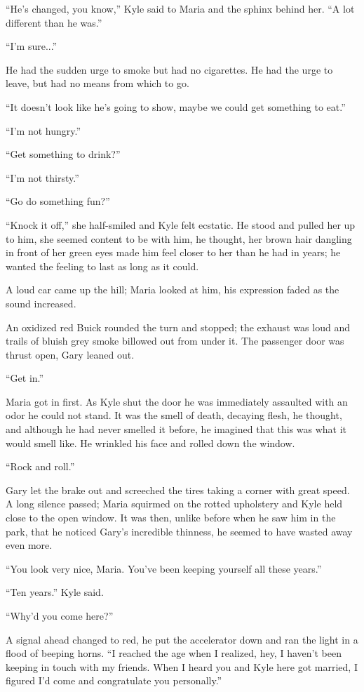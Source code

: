 ``He's changed, you know,'' Kyle said to Maria and the sphinx behind
her. ``A lot different than he was.''

``I'm sure...''

He had the sudden urge to smoke but had no cigarettes. He had the urge
to leave, but had no means from which to go.

``It doesn't look like he's going to show, maybe we could get something
to eat.''

``I'm not hungry.''

``Get something to drink?''

``I'm not thirsty.''

``Go do something fun?''

``Knock it off,'' she half-smiled and Kyle felt ecstatic. He stood and
pulled her up to him, she seemed content to be with him, he thought, her
brown hair dangling in front of her green eyes made him feel closer to
her than he had in years; he wanted the feeling to last as long as it
could.

A loud car came up the hill; Maria looked at him, his expression faded
as the sound increased.

An oxidized red Buick rounded the turn and stopped; the exhaust was loud
and trails of bluish grey smoke billowed out from under it. The
passenger door was thrust open, Gary leaned out.

``Get in.''

Maria got in first. As Kyle shut the door he was immediately assaulted
with an odor he could not stand. It was the smell of death, decaying
flesh, he thought, and although he had never smelled it before, he
imagined that this was what it would smell like. He wrinkled his face
and rolled down the window.

``Rock and roll.''

Gary let the brake out and screeched the tires taking a corner with
great speed. A long silence passed; Maria squirmed on the rotted
upholstery and Kyle held close to the open window. It was then, unlike
before when he saw him in the park, that he noticed Gary's incredible
thinness, he seemed to have wasted away even more.

``You look very nice, Maria. You've been keeping yourself all these
years.''

``Ten years.'' Kyle said.

``Why'd you come here?''

A signal ahead changed to red, he put the accelerator down and ran the
light in a flood of beeping horns. ``I reached the age when I realized,
hey, I haven't been keeping in touch with my friends. When I heard you
and Kyle here got married, I figured I'd come and congratulate you
personally.''

